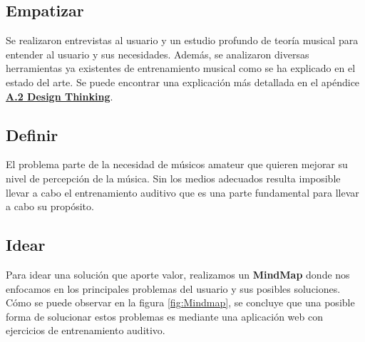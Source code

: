 \documentclass[12pt,twoside,titlepage]{report}
\begin{document}
\subsection{Empatizar}
\label{sec:empatizar}

Se realizaron entrevistas al usuario y un estudio profundo de teoría musical para entender al usuario y sus necesidades. Además, se analizaron diversas herramientas ya existentes de entrenamiento musical como se ha explicado en el estado del arte. Se puede encontrar una explicación más detallada en el apéndice \hyperref[sec:DesignThinking]{\textbf{A.2 Design Thinking}}.

\subsection{Definir}
\label{sec:definir}

El problema parte de la necesidad de músicos amateur que quieren mejorar su nivel de percepción de la música. Sin los medios adecuados resulta imposible llevar a cabo el entrenamiento auditivo que es una parte fundamental para llevar a cabo su propósito. 

\subsection{Idear}
\label{sec:idear}

Para idear una solución que aporte valor, realizamos un \textbf{MindMap} \cite{mindmap} donde nos enfocamos en los principales problemas del usuario y sus posibles soluciones.
Cómo se puede observar en la figura \ref{fig:Mindmap}, se concluye que una posible forma de solucionar estos problemas es mediante una aplicación web con ejercicios de entrenamiento auditivo. 
\end{document}
